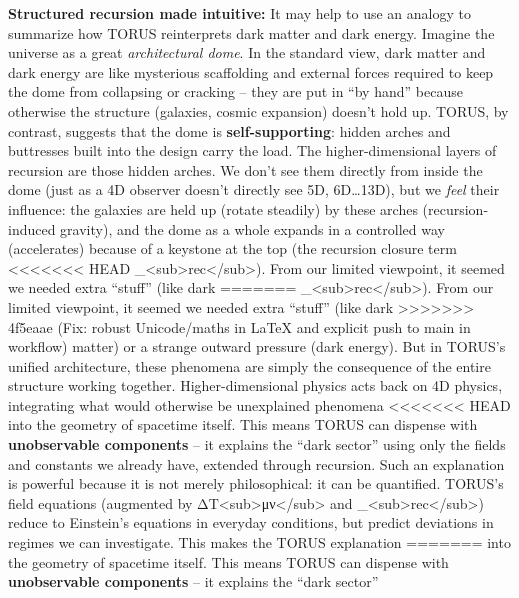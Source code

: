 \documentclass[]{article}
\begin{document}
\textbf{Structured recursion made intuitive:} It may help to use an
analogy to summarize how TORUS reinterprets dark matter and dark energy.
Imagine the universe as a great \emph{architectural dome}. In the
standard view, dark matter and dark energy are like mysterious
scaffolding and external forces required to keep the dome from
collapsing or cracking -- they are put in ``by hand'' because otherwise
the structure (galaxies, cosmic expansion) doesn't hold up. TORUS, by
contrast, suggests that the dome is \textbf{self-supporting}: hidden
arches and buttresses built into the design carry the load. The
higher-dimensional layers of recursion are those hidden arches. We don't
see them directly from inside the dome (just as a 4D observer doesn't
directly see 5D, 6D\ldots{}13D), but we \emph{feel} their influence: the
galaxies are held up (rotate steadily) by these arches
(recursion-induced gravity), and the dome as a whole expands in a
controlled way (accelerates) because of a keystone at the top (the
recursion closure term
<<<<<<< HEAD
\Lambda\_\textless sub\textgreater rec\textless/sub\textgreater). From our
limited viewpoint, it seemed we needed extra ``stuff'' (like dark
=======
\Lambda\_\textless{}sub\textgreater{}rec\textless{}/sub\textgreater{}). From
our limited viewpoint, it seemed we needed extra ``stuff'' (like dark
>>>>>>> 4f5eaae (Fix: robust Unicode/maths in LaTeX and explicit push to main in workflow)
matter) or a strange outward pressure (dark energy). But in TORUS's
unified architecture, these phenomena are simply the consequence of the
entire structure working together. Higher-dimensional physics acts back
on 4D physics, integrating what would otherwise be unexplained phenomena
<<<<<<< HEAD
into the geometry of spacetime itself\hspace{0pt}. This means TORUS can
dispense with \textbf{unobservable components} -- it explains the ``dark
sector'' using only the fields and constants we already have, extended
through recursion. Such an explanation is powerful because it is not
merely philosophical: it can be quantified. TORUS's field equations
(augmented by ΔT\textless sub\textgreater μν\textless/sub\textgreater{}
and \Lambda\_\textless sub\textgreater rec\textless/sub\textgreater) reduce to
Einstein's equations in everyday conditions, but predict deviations in
regimes we can investigate\hspace{0pt}. This makes the TORUS explanation
=======
into the geometry of spacetime itself​. This means TORUS can dispense
with \textbf{unobservable components} -- it explains the ``dark sector''
\end{document}
